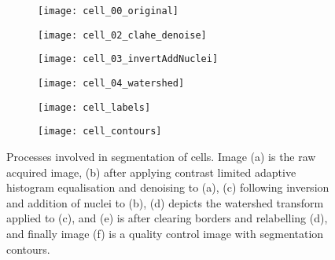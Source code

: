 \begin{figure}[htbp]\centering
	\begin{subfigure}[b]{0.45\linewidth} %
		\centering
		\texttt{[image: cell\_00\_original]}
		\caption{}
		\label{figure:image_processing:cell_segmentation:original}
		\vspace{1ex}
	\end{subfigure}
	\begin{subfigure}[b]{0.45\linewidth} %
		\centering
		\texttt{[image: cell\_02\_clahe\_denoise]}
		\caption{}
		\label{figure:image_processing:cell_segmentation:clahe_denoise}
		\vspace{1ex}
	\end{subfigure}
	\begin{subfigure}[b]{0.45\linewidth} %
		\centering
		\texttt{[image: cell\_03\_invertAddNuclei]}
		\caption{}
		\label{figure:image_processing:cell_segmentation:invertAddNuclei}
		\vspace{1ex}
	\end{subfigure}
	\begin{subfigure}[b]{0.45\linewidth} %
		\centering
		\texttt{[image: cell\_04\_watershed]}
		\caption{}
		\label{figure:image_processing:cell_segmentation:watershed}
		\vspace{1ex}
	\end{subfigure}
	\begin{subfigure}[b]{0.45\linewidth} %
		\centering
		\texttt{[image: cell\_labels]}
		\caption{}
		\label{figure:image_processing:cell_segmentation:cell_labels}
		\vspace{1ex}
	\end{subfigure}
	\begin{subfigure}[b]{0.45\linewidth} %
		\centering
		\texttt{[image: cell\_contours]}
		\caption{}
		\label{figure:image_processing:cell_segmentation:contours}
		\vspace{1ex}
	\end{subfigure}
	\vspace{-1ex}
\caption[Cell segmentation]{Processes involved in segmentation of cells. Image (a) is the raw acquired image, (b) after applying contrast limited adaptive histogram equalisation and denoising to (a), (c) following inversion and addition of nuclei to (b), (d) depicts the watershed transform applied to (c), and (e) is after clearing borders and relabelling (d), and finally image (f) is a quality control image with segmentation contours.}
\label{figure:image_processing:cell_segmentation}
\end{figure}


